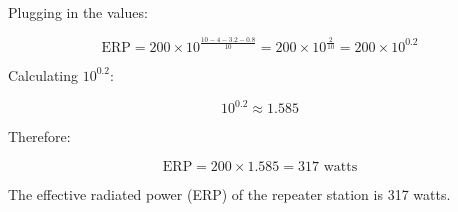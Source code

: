 Plugging in the values:

\[
\text{ERP} = 200 \times 10^{\frac{10 - 4 - 3.2 - 0.8}{10}} = 200 \times 10^{\frac{2}{10}} = 200 \times 10^{0.2}
\]

Calculating \( 10^{0.2} \):

\[
10^{0.2} \approx 1.585
\]

Therefore:

\[
\text{ERP} = 200 \times 1.585 = 317 \text{ watts}
\]

The effective radiated power (ERP) of the repeater station is 317 watts.

